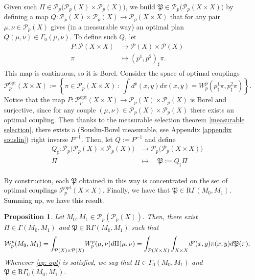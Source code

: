 \documentclass[10pt,leqno]{amsart}
\numberwithin{equation}{section}
\newtheorem{prop}[teorema]{Proposition}
\newcommand{\PP}{\mathcal{P}}
\begin{document}
Given such $\Pi \in \PP_p\big(\PP_p(X)\times\PP_p(X)\big)$, we build $\mathfrak{P}\in \PP_p\big(\PP_p(X \times X)\big)$ by defining a map $Q:\PP_p(X)\times \PP_p(X) \to \PP_p(X\times X)$ that for any pair $\mu,\nu\in \PP_p(X)$ gives (in a measurable way) an optimal plan $Q(\mu,\nu)\in \Gamma_0(\mu,\nu)$. To define such $Q$, let 
\begin{equation}\label{eq: 3.6}
    \begin{aligned}
        P:\PP(X\times X) & \to \PP(X)\times \PP(X)
        \\
        \pi \quad & \mapsto (p^1,p^2)_\sharp \pi.
    \end{aligned}
\end{equation}
This map is continuous, so it is Borel.
Consider the space of optimal couplings 
\begin{equation}
    \mathcal{P}^{\operatorname{opt}}_p (X\times X) := \left\{\pi \in \PP_p(X\times X) \ : \ \int d^p(x,y) d\pi(x,y) = W_p^p(p^1_\sharp \pi,p^2_\sharp \pi)\right\}.
\end{equation}
Notice that the map $P: \mathcal{P}^{\operatorname{opt}}_p(X\times X) \to \PP_p(X) \times \PP_p(X)$ is Borel and surjective, since for any couple $(\mu,\nu) \in \PP_p(X) \times \PP_p(X)$ there exists an optimal coupling. Then thanks to the measurable selection theorem \ref{measurable selection}, there exists a (Souslin-Borel measurable, see Appendix \ref{appendix souslin}) right inverse $P^{-1}$. Then, let $Q:= P^{-1}$ and define 
\begin{equation}
\begin{aligned}
    Q_\sharp : \PP_p\big(\PP_p(X) \times \PP_p(X)\big) & \to \PP_p\big(\PP_p(X\times X)\big)
    \\
    \Pi \quad & \mapsto \quad \mathfrak{P}:= Q_\sharp  \Pi
\end{aligned}
\end{equation}

By construction, each $\mathfrak{P}$ obtained in this way is concentrated on the set of optimal couplings $\PP^{\operatorname{opt}}_p(X\times X)$. Finally, we have that $\mathfrak{P}\in \mathrm{R}\Gamma(M_0,M_1)$. Summing up, we have this result.

\begin{prop}\label{prop: coupling and rand couplings}
    Let $M_0,M_1\in\PP_p(\PP_p(X))$. Then, there exist $\Pi \in \Gamma(M_0,M_1)$ and $\mathfrak{P}\in \mathrm{R}\Gamma(M_0,M_1)$ such that 
    \begin{equation}\label{eq: opt}
        \mathcal{W}_p^p(M_0,M_1) = \int_{\PP(X)\times \PP(X)} \hspace{-0.05cm}W_p^p(\mu,\nu) d\Pi(\mu,\nu) = \int_{\PP(X\times X)}\int_{X\times X} \hspace{-0.05cm}d^p(x,y)\pi(x,y)d\mathfrak{P}(\pi).
    \end{equation}
    Whenever \eqref{eq: opt} is satisfied, we say that $\Pi\in \Gamma_0(M_0,M_1)$ and $\mathfrak{P}\in \mathrm{R}\Gamma_0(M_0,M_1)$.
\end{prop}
\end{document}
